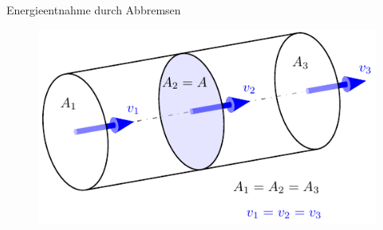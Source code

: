 \begin{frame}{Energieentnahme durch Abbremsen} 
\begin{figure}[htbp]
	\begin{center}
		\begin{minipage}[c]{0.4\linewidth}
			\includegraphics[width=\linewidth]{WEN/streamtube1.pdf}
		\end{minipage}
		\begin{minipage}[c]{0.15\linewidth}

\end{minipage}
\end{center}
\end{figure}
\end{frame}
